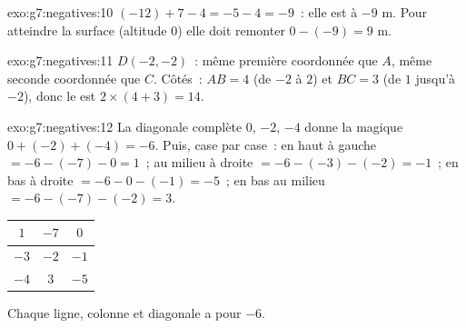 \begin{solution}{exo:g7:negatives:10}
$(-12) + 7 - 4 = -5 - 4 = -9$~: elle est à $-9$ m. Pour atteindre la
surface (altitude $0$) elle doit remonter $0 - (-9) = 9$ m.
\end{solution}

\begin{solution}{exo:g7:negatives:11}
$D(-2, -2)$~: même première coordonnée que $A$, même seconde
coordonnée que $C$. Côtés~: $AB = 4$ (de $-2$ à $2$) et $BC = 3$ (de
$1$ jusqu'à $-2$), donc le  est $2 \times (4 + 3) = 14$.
\end{solution}

\begin{solution}{exo:g7:negatives:12}
La diagonale complète $0$, $-2$, $-4$ donne la  magique
$0 + (-2) + (-4) = -6$. Puis, case par case~:
en haut à gauche $= -6 - (-7) - 0 = 1$~; au milieu à droite
$= -6 - (-3) - (-2) = -1$~; en bas à droite $= -6 - 0 - (-1) = -5$~;
en bas au milieu $= -6 - (-7) - (-2) = 3$.
\begin{center}
\renewcommand{\arraystretch}{1.4}
\begin{tabular}{|c|c|c|}
\hline
$1$ & $-7$ & $0$ \\
\hline
$-3$ & $-2$ & $-1$ \\
\hline
$-4$ & $3$ & $-5$ \\
\hline
\end{tabular}
\end{center}
Chaque ligne, colonne et diagonale a pour  $-6$.
\end{solution}

